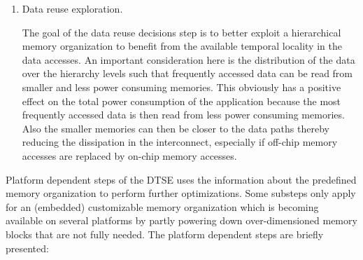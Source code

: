 \begin{enumerate}
  \item Data reuse exploration.
  
The goal of the data reuse decisions step is to better exploit a hierarchical memory organization to benefit from the available temporal locality in the data accesses. 
An important consideration here is the distribution of the data over the hierarchy levels such that frequently accessed data can be read from smaller and less power consuming memories. 
This obviously has a positive effect on the total power consumption of the application because the most frequently accessed data is then read from less power consuming memories. 
Also the smaller memories can then be closer to the data paths thereby reducing the dissipation in the interconnect, especially if off-chip memory accesses are replaced by on-chip memory accesses.
 
\end{enumerate}

Platform dependent steps of the DTSE uses the information about the predefined memory organization to perform further optimizations. 
Some substeps only apply for an (embedded) customizable memory organization which is becoming available on several platforms by partly powering down over-dimensioned memory blocks that are not fully needed. The platform dependent steps are briefly presented:


